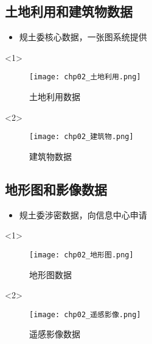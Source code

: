 \subsection{土地利用和建筑物数据}
\begin{frame}[t]{\subsecname}
\begin{itemize}
\item 规土委核心数据，一张图系统提供
\end{itemize}

\begin{overlayarea}{\textwidth}{\textheight}
\vspace{-5pt}
  \begin{onlyenv}<1>
\begin{figure}
  \centering
\texttt{[image: chp02\_土地利用.png]}
  \caption{土地利用数据}
\end{figure}
  \end{onlyenv}

\vspace{-5pt}
  \begin{onlyenv}<2>
\begin{figure}
  \centering
\texttt{[image: chp02\_建筑物.png]}
  \caption{建筑物数据}
\end{figure}
  \end{onlyenv}
\end{overlayarea}
\end{frame}

\subsection{地形图和影像数据}

\begin{frame}[t]{\subsecname}
\begin{itemize}
\item 规土委涉密数据，向信息中心申请 
\end{itemize}

\begin{overlayarea}{\textwidth}{\textheight}
\vspace{-5pt}
  \begin{onlyenv}<1>
\begin{figure}
  \centering
\texttt{[image: chp02\_地形图.png]}
  \caption{地形图数据}
\end{figure}
  \end{onlyenv}

\vspace{-10pt}
  \begin{onlyenv}<2>
\begin{figure}
  \centering
\texttt{[image: chp02\_遥感影像.png]}
  \caption{遥感影像数据}
\end{figure}
  \end{onlyenv}
\end{overlayarea}
\end{frame}


